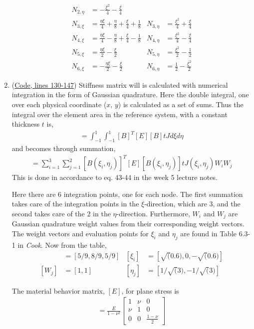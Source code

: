 \documentclass{article}
\begin{document}
\begin{enumerate}
\begin{align*}
	N_{2,\eta} &= - \frac{\xi^{2}}{4} - \frac{\xi}{4} \\
	N_{3,\xi} &= \frac{\eta \xi}{4} + \frac{\eta}{8} + \frac{\xi}{4} + \frac{1}{8} & 
	N_{3,\eta} &= \frac{\xi^{2}}{4} + \frac{\xi}{4} \\
	N_{4,\xi} &= \frac{\eta \xi}{4} - \frac{\eta}{8} + \frac{\xi}{4} - \frac{1}{8} &
	N_{4,\eta} &= \frac{\xi^{2}}{4} - \frac{\xi}{4} \\
	N_{5,\xi} &= \frac{\eta \xi}{2} - \frac{\xi}{2} &
	N_{5,\eta} &= \frac{\xi^{2}}{2} - \frac{1}{2} \\   
	N_{6,\xi} &= - \frac{\eta \xi}{2} - \frac{\xi}{2} &
	N_{6,\eta} &= \frac{1}{2} - \frac{\xi^{2}}{2}
\end{align*}
\item (\hyperref[code1]{Code, lines 130-147}) Stiffness matrix will is calculated with numerical integration in the form of Gaussian quadrature. Here the double integral, one over each physical coordinate ($x$, $y$) is calculated as a set of sums. Thus the integral over the element area in the reference system, with a constant thickness $t$ is, 
	\begin{align}
		[k] = \int_{-1}^1 \int_{-1}^1 [B]^T [E] [B] t J d\xi d\eta
	\end{align}
and becomes through summation, 
\begin{align}
	[k] = \sum_{i=1}^{3} \sum_{j=1}^{2} [B(\xi_i, \eta_j)]^T [E] [B(\xi_i, \eta_j)] t J(\xi_i, \eta_j) W_i W_j
\end{align}
This is done in accordance to eq. 43-44 in the week 5 lecture notes. 

Here there are 6 integration points, one for each node. The first summation takes care of the integration points in the $\xi$-direction, which are 3, and the second takes care of the 2 in the $\eta$-direction. Furthermore, $W_i$ and $W_j$ are Gaussian quadrature weight values from their corresponding weight vectors. The weight vectors and evaluation points for $\xi_i$ and $\eta_j$ are found in Table 6.3-1 in \textit{Cook}. Now from the table, 
\begin{align}
	[W_i] &= [5/9, 8/9, 5/9]  &[\xi_i] &= [\sqrt(0.6), 0, -\sqrt(0.6)]\\
	[W_j] &= [1, 1]  &[\eta_j] &= [1/\sqrt(3), -1/\sqrt(3)]
\end{align}

The material behavior matrix, $[E]$, for plane stress is 
\begin{align}
	[E] = \frac{E}{1-\nu^2} \begin{bmatrix} 1 & \nu & 0 \\ \nu & 1 & 0 \\ 0 & 0 & \frac{1-\nu}{2} \end{bmatrix}
\end{align}


\end{enumerate}
\end{document}
